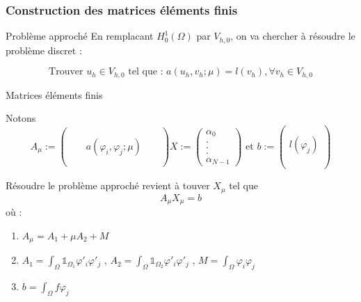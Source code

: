 \documentclass[10pt]{beamer}
\begin{document}
\subsubsection{Construction des matrices éléments finis}



\begin{frame}{Problème approché}
\noindent En remplacant $H_{0}^{1}(\Omega)$ par $V_{h,0}$, on va chercher à résoudre le problème discret : 

\begin{equation*} 
\text{Trouver } u_h \in V_{h,0} \text{ tel que : } a(u_h, v_h;\mu) = l(v_h), \forall v_h \in V_{h,0}
\end{equation*}

\end{frame}




\begin{frame}{Matrices éléments finis}

\noindent Notons 
$$
A_{\mu} := 
\begin{pmatrix}
 &  &  & & \\
 &  &  &  & \\
 &  &  a(\varphi_{i},\varphi_{j};\mu)  &  & \\
  &  &  & & \\
 &  &  & &
\end{pmatrix} 
X :=\begin{pmatrix}
 \alpha_0   \\
 .  \\
 . \\
 . \\
\alpha_{N-1} 
\end{pmatrix} \text{ et } 
b := 
\begin{pmatrix}
\\
\\
l(\varphi_{j}) \\
\\
\\
\end{pmatrix}
$$

\noindent Résoudre le problème approché revient à touver $X_{\mu}$ tel que $$ A_{\mu}X_{\mu}=b$$
où :
\begin{enumerate}
    \item $A_{\mu} = A_{1} + \mu A_{2} + M $  
    \item $A_{1} = \int_{\Omega} \mathbb{1}_{\Omega_{1}} \varphi'_{i} \varphi'_{j}    \text{ ,  } A_{2} = \int_{\Omega} \mathbb{1}_{\Omega_{2}} \varphi'_{i} \varphi'_{j} \text{  ,  }  M = \int_{\Omega} \varphi_{i} \varphi_{j}$
    \item  $ b = \int_{\Omega} f \varphi_{j}$
\end{enumerate}

\end{frame}
\end{document}
